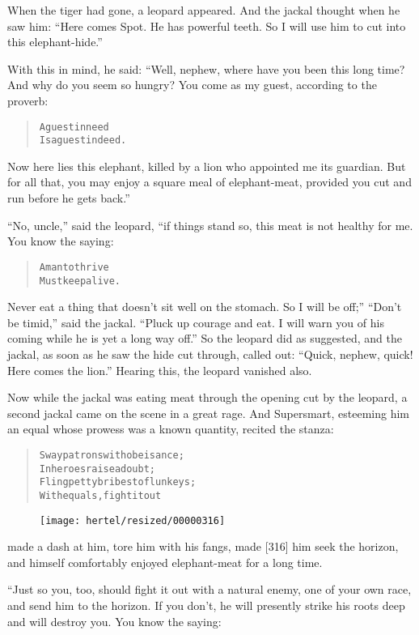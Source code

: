 \documentclass[article, twoside, 10pt]{memoir}
\renewenvironment{verbatim}{%
\begin{quote}%
\vskip -10pt%
\begin{alltt}\normalfont\small}{\end{alltt}%
\end{quote}%
\vskip -10pt
} %
\begin{document}
When the tiger had gone, a leopard appeared. And the jackal thought
when he saw him:
``Here comes Spot. He has powerful teeth. So I will use him to cut into this elephant-hide.''

With this in mind, he said: “Well, nephew, where have you been this
long time? And why do you seem so hungry? You come as my guest,
according to the proverb:

\begin{verbatim}
A guest in need
Is a guest indeed.
\end{verbatim}
Now here lies this elephant, killed by a lion who appointed me its
guardian. But for all that, you may enjoy a square meal of
elephant-meat, provided you cut and run before he gets back.”

``No, uncle,'' said the leopard, “if things stand so, this meat is
not healthy for me. You know the saying:

\begin{verbatim}
A man to thrive
Must keep alive.
\end{verbatim}
Never eat a thing that doesn't sit well on the stomach. So I will
be off;” ``Don't be timid,'' said the jackal.
``Pluck up courage and eat. I will warn you of his coming while he is yet a long way off.''
So the leopard did as suggested, and the jackal, as soon as he saw
the hide cut through, called out:
``Quick, nephew, quick! Here comes the lion.'' Hearing this, the
leopard vanished also.

Now while the jackal was eating meat through the opening cut by the
leopard, a second jackal came on the scene in a great rage. And
Supersmart, esteeming him an equal whose prowess was a known
quantity, recited the stanza:

\begin{verbatim}
Sway patrons with obeisance;
    In heroes raise a doubt;
Fling petty bribes to flunkeys;
    With equals, fight it out{\textemdash}
\end{verbatim}
\begin{figure}[p]\texttt{[image: hertel/resized/00000316]}\end{figure}made a dash at him, tore him with his fangs, made [316] him seek
the horizon, and himself comfortably enjoyed elephant-meat for a
long time.

“Just so you, too, should fight it out with a natural enemy, one of
your own race, and send him to the horizon. If you don't, he will
presently strike his roots deep and will destroy you. You know the
saying:
\end{document}

